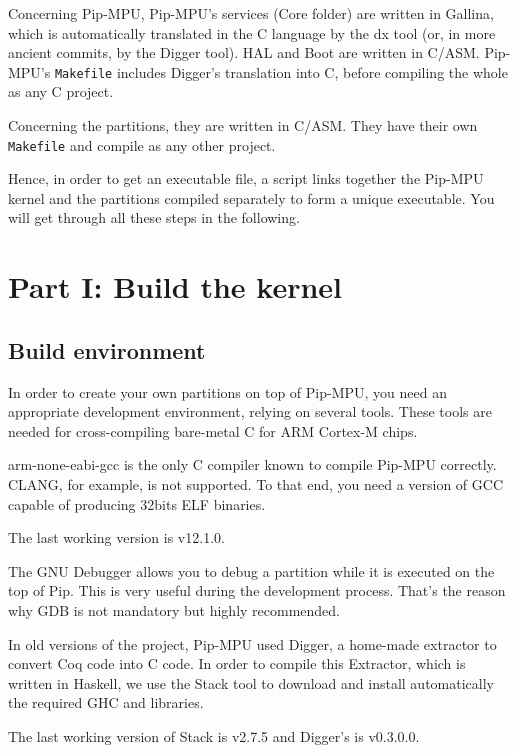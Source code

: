 \documentclass[10pt,a4paper,titlepage]{refart}
\begin{document}
Concerning Pip-MPU, Pip-MPU's services (Core folder) are written in Gallina, which is automatically translated in the C language by the dx tool 
(or, in more ancient commits, by the Digger tool). HAL and Boot are written in C/ASM.
Pip-MPU's \texttt{Makefile} includes Digger's translation into C, before compiling the whole as any C project.

Concerning the partitions, they are written in C/ASM.
They have their own \texttt{Makefile} and compile as any other project.

Hence, in order to get an executable file, a script links together the Pip-MPU kernel and the partitions compiled separately to form a unique executable.
You will get through all these steps in the following.

\section{Part I: Build the kernel} \label{first}

\subsection{Build environment}
In order to create your own partitions on top of Pip-MPU, you need an appropriate development environment, relying on several tools.
These tools are needed for cross-compiling bare-metal C for ARM Cortex-M chips.

arm-none-eabi-gcc is the only C compiler known to compile Pip-MPU correctly.
CLANG, for example, is not supported. To that end, you need a version of GCC capable of producing 32bits ELF binaries.

The last working version is v12.1.0.

 
The GNU Debugger allows you to debug a partition while it is executed on the
top of Pip. This is very useful during the development process. That's the
reason why GDB is not mandatory but highly recommended.


In old versions of the project, Pip-MPU used Digger, a home-made extractor to convert Coq code into C code.
In order to compile this Extractor, which is written in Haskell, we use the Stack tool to download and install automatically the required GHC and libraries.

The last working version of Stack is v2.7.5 and Digger's is v0.3.0.0.
\end{document}
